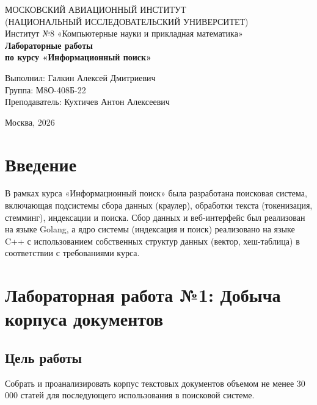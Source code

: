 \documentclass[a4paper,12pt]{article}
\begin{document}
\begin{titlepage}
    \centering
    {\fontsize{14pt}{16pt}\selectfont МОСКОВСКИЙ АВИАЦИОННЫЙ ИНСТИТУТ\\(НАЦИОНАЛЬНЫЙ ИССЛЕДОВАТЕЛЬСКИЙ УНИВЕРСИТЕТ)}\\[0.5cm]
    {\fontsize{12pt}{14pt}\selectfont Институт №8 «Компьютерные науки и прикладная математика»}\\[4cm]
    
    {\fontsize{16pt}{18pt}\selectfont \textbf{Лабораторные работы}}\\
    {\fontsize{14pt}{16pt}\selectfont \textbf{по курсу «Информационный поиск»}}\\[5cm]
    
    \vfill
    \begin{flushright} 
        \begin{minipage}{0.51\textwidth}
            Выполнил: Галкин Алексей Дмитриевич\\
            Группа: М8О-408Б-22\\
            Преподаватель: Кухтичев Антон Алексеевич
        \end{minipage}
    \end{flushright}
    
    \vfill
    {\large Москва, 2026}
\end{titlepage}

\tableofcontents
\newpage

\section{Введение}
В рамках курса «Информационный поиск» была разработана поисковая система, включающая подсистемы сбора данных (краулер), обработки текста (токенизация, стемминг), индексации и поиска. Сбор данных и веб-интерфейс был реализован на языке Golang, а ядро системы (индексация и поиск) реализовано на языке C++ с использованием собственных структур данных (вектор, хеш-таблица) в соответствии с требованиями курса.

\section{Лабораторная работа №1: Добыча корпуса документов}

\subsection{Цель работы}
Собрать и проанализировать корпус текстовых документов объемом не менее 30 000 статей для последующего использования в поисковой системе.
\end{document}
